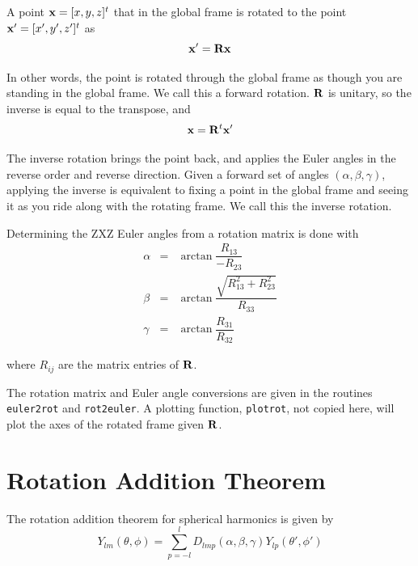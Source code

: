 A point $\mathbf{x} = [x, y, z]^t$ that in the global frame is rotated to the point $\mathbf{x}' = [x',y',z']^t$ as
\begin{equation}
\mathbf{x}' = \mathbf{R}\mathbf{x}
\end{equation}

\noindent In other words, the point is rotated through the global frame as though you are standing in the global frame. We call this a forward rotation. $\mathbf{R}$ is unitary, so the inverse is equal to the transpose, and 
\begin{equation}
\mathbf{x} = \mathbf{R}^t\mathbf{x}'
\end{equation}

The inverse rotation brings the point back, and applies the Euler angles in the reverse order and reverse direction. Given a forward set of angles $(\alpha,\beta,\gamma)$, applying the inverse is equivalent to fixing a point in the global frame and seeing it as you ride along with the rotating frame. We call this the inverse rotation.

Determining the ZXZ Euler angles from a rotation matrix is done with 
\begin{eqnarray}
\alpha & =& \arctan \dfrac{R_{13}}{-R_{23}} \\
\beta & =& \arctan \dfrac{\sqrt{R_{13}^2 + R_{23}^2} }{R_{33}}\\
\gamma &=& \arctan \dfrac{R_{31}}{R_{32}} 
\end{eqnarray}

\noindent where $R_{ij}$ are the matrix entries of $\mathbf{R}$. 

The rotation matrix and Euler angle conversions are given in the routines \texttt{euler2rot} and \texttt{rot2euler}. A plotting function,  \texttt{plotrot}, not copied here, will plot the axes of the rotated frame given $\mathbf{R}$. 

{\footnotesize
{}
}

{\footnotesize
{}
}




\clearpage
\section{Rotation Addition Theorem}

The rotation addition theorem for spherical harmonics is given by  
\begin{equation}
Y_{lm}(\theta,\phi) = \sum_{p=-l}^{l} D_{lmp}(\alpha,\beta,\gamma) Y_{lp}(\theta',\phi')
\end{equation}

